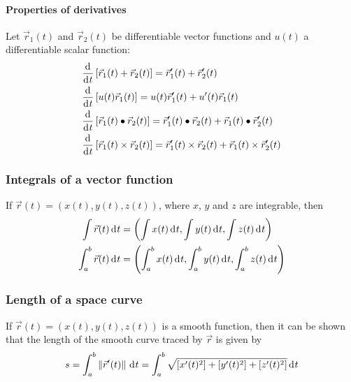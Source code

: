 \documentclass[10pt, twocolumn]{article}
\theoremstyle{remark}
\begin{document}
\paragraph*{Properties of derivatives}
Let \(\vec{r}_1 (t)\) and \(\vec{r}_2 (t)\) be differentiable vector functions and \(u(t)\) a differentiable scalar function:
\begin{align*}
   & \frac{\mathrm{d}^{}}{\mathrm{d}^{} t}\left[ \vec{r}_1 (t) + \vec{r}_2 (t) \right] = \vec{r}_1 '(t) + \vec{r}_2 '(t)                                                   \\
   & \frac{\mathrm{d}^{}}{\mathrm{d}^{} t}\left[ u(t)\vec{r}_1 (t) \right] = u(t)\vec{r}_1 '(t) + u'(t)\vec{r}_1 (t)                                                       \\
   & \frac{\mathrm{d}^{}}{\mathrm{d}^{} t}\left[ \vec{r}_1 (t) \bullet \vec{r}_2 (t) \right] = \vec{r}_1 '(t) \bullet \vec{r}_2 (t) + \vec{r}_1 (t) \bullet \vec{r}_2 '(t) \\
   & \frac{\mathrm{d}^{}}{\mathrm{d}^{} t}\left[ \vec{r}_1 (t) \times \vec{r}_2 (t) \right] = \vec{r}_1 '(t) \times \vec{r}_2 (t) + \vec{r}_1 (t) \times \vec{r}_2 '(t)    \\
\end{align*}

\subsubsection*{Integrals of a vector function}
If \(\vec{r}(t) = \left( x(t), y(t), z(t) \right)\), where \(x\), \(y\) and \(z\) are integrable, then
\begin{align*}
  \int{\vec{r}(t) \,\mathrm{d}^{} t}       & = \left( \int{x(t) \,\mathrm{d}^{} t}, \int{y(t) \,\mathrm{d}^{} t}, \int{z(t) \,\mathrm{d}^{} t} \right)                   \\
  \int_a ^b {\vec{r}(t) \,\mathrm{d}^{} t} & = \left( \int_a ^b {x(t) \,\mathrm{d}^{} t}, \int_a ^b {y(t) \,\mathrm{d}^{} t}, \int_a ^b {z(t) \,\mathrm{d}^{} t} \right)
\end{align*}

\subsubsection*{Length of a space curve}
If \(\vec{r}(t) = \left( x(t), y(t), z(t) \right)\) is a smooth function, then it can be shown that the length of the smooth curve traced by \(\vec{r}\) is given by
\[
  s = \int_a ^b {\left\| \vec{r}'(t) \right\| \,\mathrm{d}^{} t} = \int_a ^b {\sqrt{\left[ x'(t)^2 \right] + \left[ y'(t)^2 \right] + \left[ z'(t)^2 \right]} \,\mathrm{d}^{} t}
\]
\end{document}
